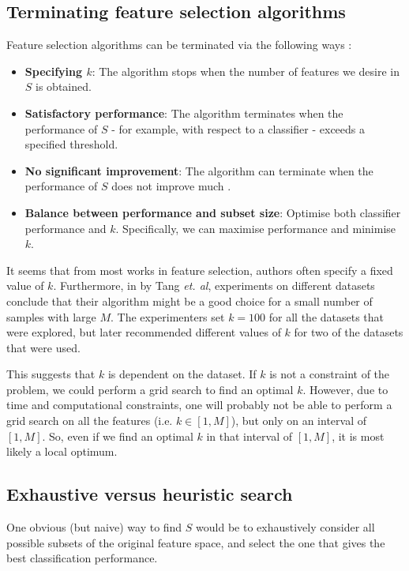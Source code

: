 \documentclass[12pt, twoside, a4paper]{report}
\begin{document}
\subsection{Terminating feature selection algorithms} \label{bg:fs:terminating}

Feature selection algorithms can be terminated via the following ways \cite{RefWorks:210}:
\begin{itemize}
  \item \textbf{Specifying $k$}: The algorithm stops when the number of features we desire in $S$ is obtained.
  \item \textbf{Satisfactory performance}: The algorithm terminates when the performance of $S$ - for example, with respect to a classifier - exceeds a specified threshold.
  \item \textbf{No significant improvement}: The algorithm can terminate when the performance of $S$ does not improve much \cite{RefWorks:215}.
  \item \textbf{Balance between performance and subset size}: Optimise both classifier performance and $k$. Specifically, we can maximise performance and minimise $k$.
\end{itemize}

It seems that from most works in feature selection, authors often specify a fixed value of $k$. Furthermore, in \cite{RefWorks:119} by Tang \textit{et. al}, experiments on different datasets conclude that their algorithm might be a good choice for a small number of samples with large $M$. The experimenters set $k=100$ for all the datasets that were explored, but later recommended different values of $k$ for two of the datasets that were used.

This suggests that $k$ is dependent on the dataset. If $k$ is not a constraint of the problem, we could perform a grid search to find an optimal $k$. However, due to time and computational constraints, one will probably not be able to perform a grid search on all the features (i.e. $k \in [1, M]$), but only on an interval of $[1, M]$. So, even if we find an optimal $k$ in that interval of $[1, M]$, it is most likely a local optimum.


\subsection{Exhaustive versus heuristic search} \label{bg:fs:exhaustive}

One obvious (but naive) way to find $S$ would be to exhaustively consider all possible subsets of the original feature space, and select the one that gives the best classification performance.
\end{document}

